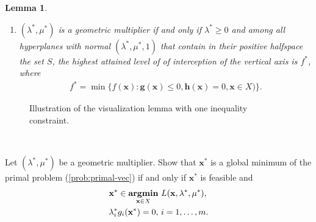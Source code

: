 \documentclass[11pt,letter,notitlepage]{article}
\newtheorem{lemma}{Lemma}
\DeclareMathOperator*{\argmin}{\bf argmin}
\begin{document}
\begin{exercise}
\begin{lemma}
\begin{enumerate}
			\item $(\lambda^*,\mu^*)$ is a geometric multiplier if and only if $\lambda^*\geq0$ and among all hyperplanes with normal $(\lambda^*,\mu^*,1)$ that contain in their positive halfspace the set $S$, the highest attained level of of interception of the vertical axis is $f^*$, where
			      \begin{align*}
				      f^*=\min\{f(\mathbf{x}):\mathbf{g}(\mathbf{x})\leq0,\mathbf{h}(\mathbf{x})=0,\mathbf{x}\in X)\}.
			      \end{align*}
		\end{enumerate}
	\end{lemma}
\end{exercise}
\begin{figure}[!h]
	\caption{Illustration of the visualization lemma with one inequality constraint.}
	\label{fig:visualization-lemma}
\end{figure}



\newpage
${}$
\newpage
\begin{exercise}
	Let $(\lambda^*,\mu^*)$ be a geometric multiplier. Show that $\mathbf{x}^*$ is a global minimum of the primal problem (\ref{prob:primal-vec}) if and only if $\mathbf{x}^*$ is feasible and
	\begin{align*}
		 & \mathbf{x}^*\in\argmin_{\mathbf{x}\in X}\,L(\mathbf{x},\lambda^*,\mu^*), \\
		 & \lambda_i^*g_i(\mathbf{x}^*)=0,\,i=1,\ldots,m.
	\end{align*}
\end{exercise}
\end{document}
